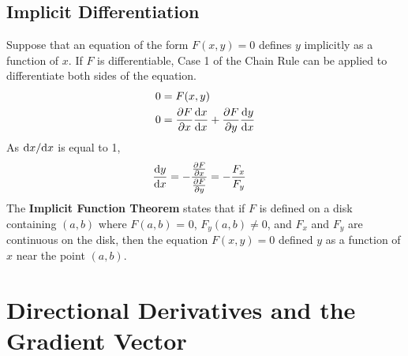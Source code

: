 \documentclass[../Calculus_\Roman{3}]{subfiles}
\begin{document}
		\subsection*{Implicit Differentiation}
			Suppose that an equation of the form $F(x, y) = 0$ defines $y$ implicitly as a function of $x$. If $F$ is differentiable, Case 1 of the Chain Rule can be applied to differentiate both sides of the equation.
				\begin{align*}
					0 &= F(x, y)  \\
					0 &= \frac{\partial F}{\partial x}\frac{\mathrm{d} x}{\mathrm{d} x} + \frac{\partial F}{\partial y}\frac{\mathrm{d} y}{\mathrm{d} x}
				\end{align*}
				As $\mathrm{d} x/\mathrm{d} x$ is equal to 1,
				\begin{align*}
					\frac{\mathrm{d} y}{\mathrm{d} x} &= -\frac{\frac{\partial F}{\partial x}}{\frac{\partial F}{\partial y}} = -\frac{F_x}{F_y}
				\end{align*}
			The \textbf{Implicit Function Theorem} states that if $F$ is defined on a disk containing $(a, b)$ where $F(a, b)$ = 0, $F_y(a, b) \ne 0$, and $F_x$ and $F_y$ are continuous on the disk, then the equation $F(x, y) = 0$ defined $y$ as a function of $x$ near the point $(a, b)$.
	\section{Directional Derivatives and the Gradient Vector}
\end{document}
